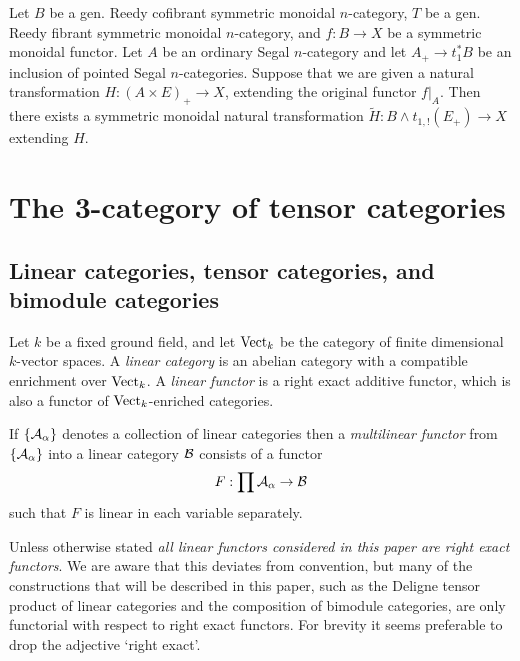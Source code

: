 \documentclass[a4paper]{amsart}
\begin{document}
\begin{theorem}
	Let $B$ be a gen. Reedy cofibrant symmetric monoidal $n$-category, $T$ be a gen. Reedy fibrant symmetric monoidal $n$-category, and $f: B \to X$ be a symmetric monoidal functor. Let $A$ be an ordinary Segal $n$-category and let $A_+ \to t^*_1 B$ be an inclusion of pointed Segal $n$-categories. Suppose that we are given a natural transformation $H: (A \times E)_+ \to X$, extending the original functor $f|_A$. Then there exists a symmetric monoidal natural transformation $\tilde{H}: B \wedge t_{1,!}(E_+) \to X$ extending $H$.  
\end{theorem}


\section{The 3-category of tensor categories}

\subsection{Linear categories, tensor categories, and bimodule categories} \label{sec-tc-lincat}



	Let $k$ be a fixed ground field, and let $\mathrm{Vect}_k$ be the category of finite dimensional $k$-vector spaces.   A {\em linear category} is an abelian category with a compatible enrichment over ${\mathrm{Vect}}_k$.  A {\em linear functor} is a right exact additive functor, which is also a functor of ${\mathrm{Vect}}_k$-enriched categories. 
	
If $\{\mathcal A_\alpha\}$ denotes a collection of linear categories then a {\em multilinear functor} from $\{\mathcal A_\alpha\}$ into a linear category $\mathcal B$ consists of a functor
\begin{equation*}
	F: \prod \mathcal A_\alpha \to \mathcal B
\end{equation*}
such that $F$ is linear in each variable separately. 

\begin{warning}
	Unless otherwise stated {\em all linear functors considered in this paper are right exact functors}.  We are aware that this deviates from convention, but many of the constructions that will be described in this paper, such as the Deligne tensor product of linear categories and the composition of bimodule categories, are only functorial with respect to right exact functors. For brevity it seems preferable to drop the adjective `right exact'. 
\end{warning} 
\end{document}
